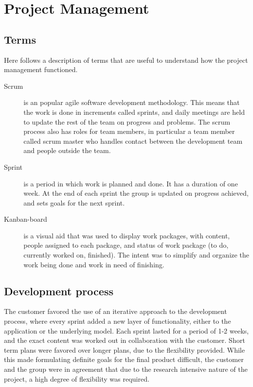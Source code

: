 \chapter{Project Management}
\section{Terms}
Here follows a description of terms that are useful to understand how the project management functioned. 

\begin{description}
\item[Scrum] \label{def:scrum}is an popular agile software development methodology. This means that the work is done in increments called sprints, and daily meetings are held to update the rest of the team on progress and problems. The scrum process also has roles for team members, in particular a team member called scrum master who handles contact between the development team and people outside the team.

\item[Sprint] \label{def:sprint} is a period in which work is planned and done. It has a duration of one week. At the end of each sprint the group is updated on progress achieved, and sets goals for the next sprint. 
\item[Kanban-board] \label{def:kanban} is a visual aid that was used to display work packages, with content, people assigned to each package, and status of work package (to do, currently worked on, finished). The intent was to simplify and organize the work being done and work in need of finishing.
\end{description}
\section{Development process}

The customer favored the use of an iterative approach to the development process, where every sprint added a new layer of functionality, either to the application or the underlying model. Each sprint lasted for a period of 1-2 weeks, and the exact content was worked out in collaboration with the customer. Short term plans were favored over longer plans, due to the flexibility provided. While this made formulating definite goals for the final product difficult, the customer and the group were in agreement that due to the research intensive nature of the project, a high degree of flexibility was required. 


